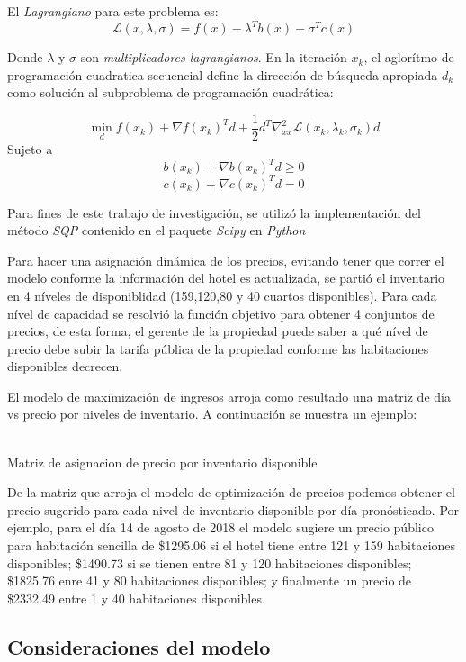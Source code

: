 El \emph{Lagrangiano} para este problema es: $$\mathcal{L}(x,\lambda,\sigma)=f(x)-\lambda^Tb(x)-\sigma^Tc(x)$$

Donde $\lambda$ y $\sigma$ son \emph{multiplicadores lagrangianos}. En la iteración $x_k$, el aglorítmo de programación cuadratica secuencial define la dirección de búsqueda apropiada $d_k$ como solución al subproblema de programación cuadrática: 

$$\min_d f(x_k) + \nabla f(x_k)^T d + \frac{1}{2}d^T \nabla_{xx}^2 \mathcal{L} (x_k,\lambda_k,\sigma_k)d$$
Sujeto a
$$b(x_k) + \nabla b(x_k)^T d\geq 0$$
$$c(x_k) + \nabla c(x_k)^T d = 0$$

Para fines de este trabajo de investigación, se utilizó la implementación del método \emph{SQP} contenido en el paquete \emph{Scipy} en  \emph{Python}

Para hacer una asignación dinámica de los precios, evitando tener que correr el modelo conforme la información del hotel es actualizada, se partió el inventario en 4 níveles de disponiblidad (159,120,80 y 40 cuartos disponibles). Para cada nível de capacidad se resolvió la función objetivo para obtener 4 conjuntos de precios, de esta forma, el gerente de la propiedad puede saber a qué nível de precio debe subir la tarifa pública de la propiedad conforme las habitaciones disponibles decrecen.

El modelo de maximización de ingresos arroja como resultado una matriz de día vs precio por niveles de inventario. A continuación se muestra un ejemplo:
\\
\\

\begin{table}[H]
  \centering
  \par
  \caption{Matriz de asignacion de precio por inventario disponible} 
\end{table}

De la matriz que arroja el modelo de optimización de precios podemos obtener el precio sugerido para cada nivel de inventario disponible por día pronósticado. Por ejemplo, para el día 14 de agosto de 2018 el modelo sugiere un precio público para habitación sencilla de \$1295.06 si el hotel tiene entre 121 y 159 habitaciones disponibles; \$1490.73 si se tienen entre 81 y 120 habitaciones disponibles; \$1825.76 enre 41 y 80 habitaciones disponibles; y finalmente un precio de \$2332.49 entre 1 y 40 habitaciones disponibles.

\subsection*{Consideraciones del modelo}

